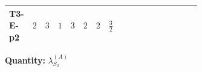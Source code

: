 \documentclass[8pt]{article}
\begin{document}
\begin{landscape}
\begin{longtable}{@{}llcccccc >{\raggedright\arraybackslash}p{0.21\linewidth} >{\raggedright\arraybackslash}p{0.21\linewidth} >{\raggedright\arraybackslash}p{0.21\linewidth}@{}}
T3-E-p2 & $2$ & $3$ & $1$ & $3$ & $2$ & $2$ & $\frac{3}{2}$ & \scriptsize\adjustbox{max width=\linewidth}{$\begin{gathered} +\frac{3 {\lambda_{12}^{(1)}}^2}{4}\end{gathered}$} & \scriptsize\adjustbox{max width=\linewidth}{$\begin{gathered} +{\lambda_{12}^{(1)}} {\lambda_{12}^{(\times)}}\end{gathered}$} & \scriptsize\adjustbox{max width=\linewidth}{$\begin{gathered} +12 {\lambda_{12}^{(A)}}^2\end{gathered}$} \\
\midrule
\bottomrule
\end{longtable}
\clearpage
\noindent\textbf{Quantity: }$\lambda_{S_2}^{(A)}$\par\smallskip

\end{landscape}
\end{document}
